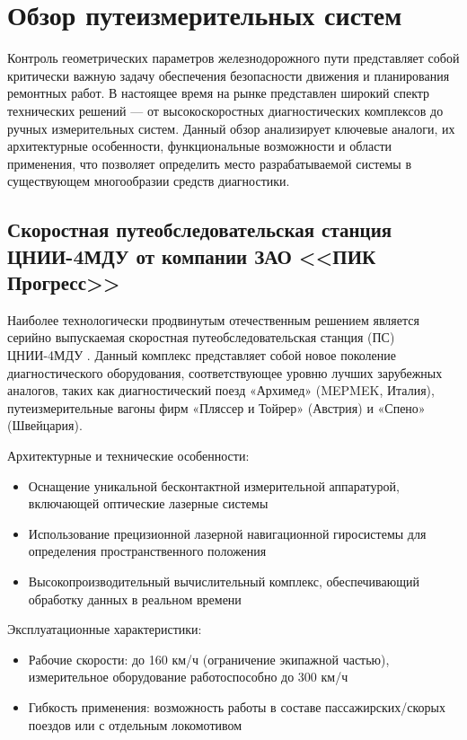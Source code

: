\chapter{Обзор путеизмерительных систем}
\label{chap:review}

Контроль геометрических параметров железнодорожного пути представляет собой критически важную задачу обеспечения безопасности движения и планирования ремонтных работ. В настоящее время на рынке представлен широкий спектр технических решений — от высокоскоростных диагностических комплексов до ручных измерительных систем. Данный обзор анализирует ключевые аналоги, их архитектурные особенности, функциональные возможности и области применения, что позволяет определить место разрабатываемой системы в существующем многообразии средств диагностики.


\section{Скоростная путеобследовательская станция ЦНИИ-4МДУ от компании ЗАО <<ПИК Прогресс>>} 
\label{sec:cnii_4mdu}

Наиболее технологически продвинутым отечественным решением является серийно выпускаемая скоростная путеобследовательская станция (ПС) ЦНИИ-4МДУ \cite{rail_measurement_spec}. Данный комплекс представляет собой новое поколение диагностического оборудования, соответствующее уровню лучших зарубежных аналогов, таких как диагностический поезд «Архимед» (MEPMEK, Италия), путеизмерительные вагоны фирм «Пляссер и Тойрер» (Австрия) и «Спено» (Швейцария).

Архитектурные и технические особенности:
\begin{itemize}
	\item Оснащение уникальной бесконтактной измерительной аппаратурой, включающей оптические лазерные системы
	\item Использование прецизионной лазерной навигационной гиросистемы для определения пространственного положения
	\item Высокопроизводительный вычислительный комплекс, обеспечивающий обработку данных в реальном времени
\end{itemize}

Эксплуатационные характеристики:
\begin{itemize}
	\item Рабочие скорости: до 160 км/ч (ограничение экипажной частью), измерительное оборудование работоспособно до 300 км/ч
	\item Гибкость применения: возможность работы в составе пассажирских/скорых поездов или с отдельным локомотивом
\end{itemize}


